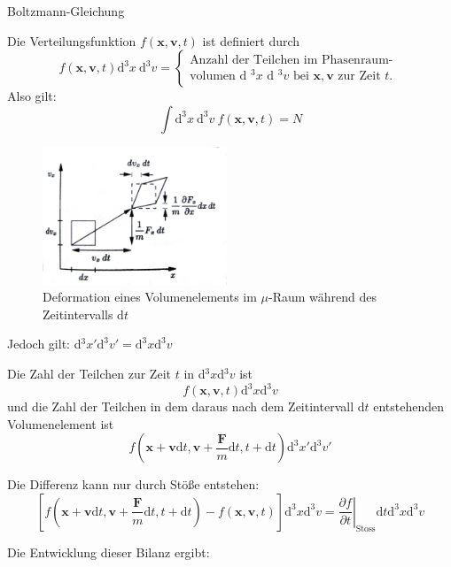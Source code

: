 \documentclass[ngerman]{article}
\begin{document}
\begin{section}{Boltzmann-Gleichung}

 


 Die Verteilungsfunktion $ f(\boldsymbol{x}, \boldsymbol{v}, t)$  ist definiert durch
 $$  f( \boldsymbol{x}, \boldsymbol{v}, t)  \text{d}^3x \  \text{d}^3v =  \begin{cases} \text{Anzahl der Teilchen im Phasenraum-} \\ \text{volumen d $^3x$ d $^3v$  bei $\boldsymbol{x}, \boldsymbol{v}$ zur Zeit $t$. } \end{cases} $$
 Also gilt:
		$$ \int \text{d}^3x \  \text{d}^3v \ f(\boldsymbol{x}, \boldsymbol{v}, t) = N $$


\begin{figure}[h]
\includegraphics[width=5.5cm]{boltzmann.JPG}
\caption{
Deformation eines Volumenelements im $ \mu$-Raum während des Zeitintervalls d$t$}
\end{figure}
Jedoch gilt: d$^3x'\text{d}^3v'= \text{d}^3x\text{d}^3v$ 






Die Zahl der Teilchen zur Zeit $t$ in d$^3x$d$^3v$  ist $$ f( \boldsymbol{x}, \boldsymbol{v}, t)  \text{d}^3x \text{d}^3v$$
und die Zahl der Teilchen in dem daraus nach dem Zeitintervall d$t$ entstehenden Volumenelement ist $$f\left(\boldsymbol{x}+\boldsymbol{v} \text{d}t, \boldsymbol{v} + \frac{\boldsymbol{F}}{m} \text{d}t, t + \text{d}t\right) \text{d}^3x' \text{d}^3v'$$




Die Differenz  kann nur durch Stöße entstehen: $$\left[f\left(\boldsymbol{x}+\boldsymbol{v} \text{d}t, \boldsymbol{v} + \frac{\boldsymbol{F}}{m} \text{d}t, t + \text{d}t\right) - f\left( \boldsymbol{x}, \boldsymbol{v}, t\right) \right] \text{d}^3x \text{d}^3v = \left.\frac{\partial f}{\partial t}\right|_\mathrm{Stoss} \text{d}t\text{d}^3x \text{d}^3v$$



Die Entwicklung dieser Bilanz ergibt:
    
        
     

\end{section}
\end{document}
